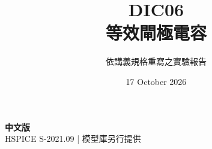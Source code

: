\documentclass[11pt,a4paper]{article}
\title{\color{accent}DIC06\\[4pt]等效閘極電容}
\author{依講義規格重寫之實驗報告}
\date{17 October 2026}
\begin{document}
\maketitle
\begin{center}\small\textbf{中文版}\\
HSPICE S-2021.09 \quad | \quad 模型庫另行提供
\end{center}


\end{document}
